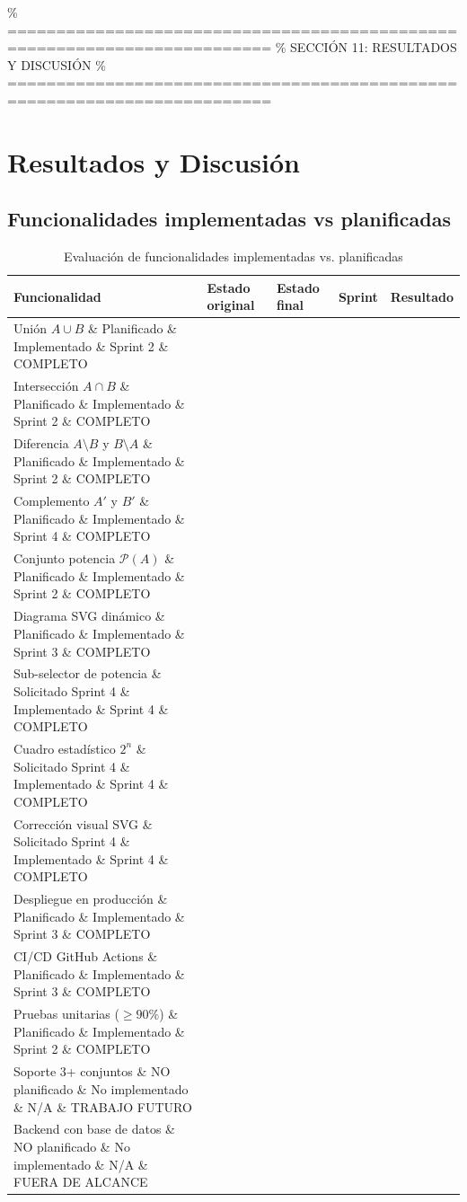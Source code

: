 \documentclass[11pt,a4paper]{article}
\begin{document}
\newpage

\% =========================================================================
\% SECCIÓN 11: RESULTADOS Y DISCUSIÓN
\% =========================================================================
\section{Resultados y Discusión}

\subsection{Funcionalidades implementadas vs planificadas}
\begin{table}[htbp]
\centering
\small
\caption{Evaluación de funcionalidades implementadas vs. planificadas}
\begin{tabularx}{\textwidth}{p{3.8cm}p{2.4cm}p{2.4cm}p{1.8cm}X}
\toprule
\textbf{Funcionalidad} & \textbf{Estado original} & \textbf{Estado final} & \textbf{Sprint} & \textbf{Resultado} \\
\midrule
Unión $A \cup B$ \& Planificado \& Implementado \& Sprint 2 \& COMPLETO \\
Intersección $A \cap B$ \& Planificado \& Implementado \& Sprint 2 \& COMPLETO \\
Diferencia $A \setminus B$ y $B \setminus A$ \& Planificado \& Implementado \& Sprint 2 \& COMPLETO \\
Complemento $A'$ y $B'$ \& Planificado \& Implementado \& Sprint 4 \& COMPLETO \\
Conjunto potencia $\mathcal{P}(A)$ \& Planificado \& Implementado \& Sprint 2 \& COMPLETO \\
Diagrama SVG dinámico \& Planificado \& Implementado \& Sprint 3 \& COMPLETO \\
Sub-selector de potencia \& Solicitado Sprint 4 \& Implementado \& Sprint 4 \& COMPLETO \\
Cuadro estadístico $2^n$ \& Solicitado Sprint 4 \& Implementado \& Sprint 4 \& COMPLETO \\
Corrección visual SVG \& Solicitado Sprint 4 \& Implementado \& Sprint 4 \& COMPLETO \\
Despliegue en producción \& Planificado \& Implementado \& Sprint 3 \& COMPLETO \\
CI/CD GitHub Actions \& Planificado \& Implementado \& Sprint 3 \& COMPLETO \\
Pruebas unitarias ($\ge 90\%$) \& Planificado \& Implementado \& Sprint 2 \& COMPLETO \\
Soporte 3+ conjuntos \& NO planificado \& No implementado \& N/A \& TRABAJO FUTURO \\
Backend con base de datos \& NO planificado \& No implementado \& N/A \& FUERA DE ALCANCE \\
\bottomrule
\end{tabularx}
\end{table}
\end{document}
